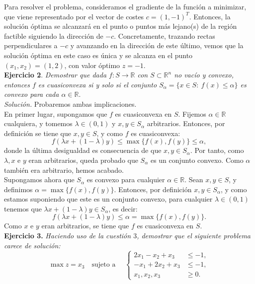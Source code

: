 \documentclass[11pt,a4paper]{article}
\newcommand{\R}{\mathbb{R}}
\begin{document}
Para resolver el problema, consideramos el gradiente de la función a minimizar, que viene representado por el vector de costes $c=(1, -1)^T$. Entonces, la solución óptima se alcanzará en el punto o puntos más lejano(s) de la región factible siguiendo la dirección de $-c$. Concretamente, trazando rectas perpendiculares a $-c$ y avanzando en la dirección de este último, vemos que la solución óptima en este caso es única y se alcanza en el punto $(x_1, x_2)=(1, 2)$, con valor óptimo $z=-1$.\\


\textbf{Ejercicio 2}. \emph{Demostrar que dada \( f:S \to \mathbb{R}\) con \(S \subset \mathbb{R}^{n} \) no vacío y convexo, entonces \( f \) es cuasiconvexa si y solo si el conjunto \( S_{\alpha} = \{x \in S: \ f(x) \leq \alpha \} \) es convexo para cada \( \alpha \in \mathbb{R} \)}.\\

\textit{Solución.} Probaremos ambas implicaciones.\\

\boxed{$\Rightarrow$} En primer lugar, supongamos que $f$ es cuasiconvexa en $S$. Fijemos $\alpha\in \R$ cualquiera, y tomemos $\lambda\in (0,1)$ y $x,y\in S_\alpha$ arbitrarios. Entonces, por definición se tiene que $x,y \in S$, y como $f$ es cuasiconvexa:
\[
f(\lambda x + (1-\lambda)y) \leq \max\{f(x), f(y)\} \leq \alpha,
\]
donde la última desigualdad es consecuencia de que $x,y\in S_\alpha$. Por tanto, como $\lambda, x$ e $y$ eran arbitrarios, queda probado que $S_\alpha$ es un conjunto convexo. Como $\alpha$ también era arbitrario, hemos acabado.\\

\boxed{$\Leftarrow$} Supongamos ahora que $S_\alpha$ es convexo para cualquier $\alpha\in\R$. Sean $x,y\in S$, y definimos $\alpha=\max\{f(x), f(y)\}$. Entonces, por definición $x,y\in S_{\alpha}$, y como estamos suponiendo que este es un conjunto convexo, para cualquier $\lambda \in (0,1)$ tenemos que $\lambda x + (1-\lambda)y\in S_\alpha$, es decir:
\[
f(\lambda x + (1-\lambda)y)\leq \alpha =\max\{f(x), f(y)\}.
\]
Como $x$ e $y$ eran arbitrarios, se tiene que $f$ es cuasiconvexa en $S$.\\

 \textbf{Ejercicio 3.} \emph{Haciendo uso de la cuestión \( 3 \), demostrar que el siguiente problema carece de solución:}
        \[
        \max z=x_{3} \quad \text{sujeto a } \quad \begin{cases}
          2x_{1}- x_{2} + x_{3} &\leq -1,\\
          -x_{1} + 2x_{2} + x_{3} &\leq -1,\\
          x_{1}, x_{2}, x_{3} &\geq 0.
        \end{cases}
        \]
\end{document}
